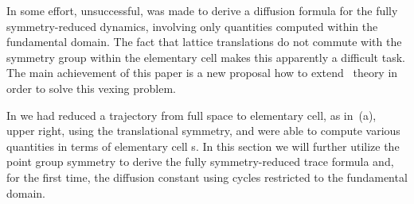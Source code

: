 




In  some effort, unsuccessful, was made to derive a
diffusion formula for the fully symmetry-reduced dynamics, involving only
quantities computed within the fundamental domain. The fact that lattice
translations do not commute with the symmetry group within the elementary
cell makes this apparently a difficult task. The main achievement of this
paper is a new proposal how to extend \po\ theory in order to solve this
vexing problem.

In  we had
reduced a trajectory from full space to elementary cell, as in
\,(a), upper right, using the translational
symmetry, and were able to compute various quantities in terms of
elementary cell \po s. In this section we will further utilize the
point group symmetry to derive the fully symmetry-reduced trace
formula and, for the first time, the diffusion constant using cycles
restricted to the fundamental domain.


